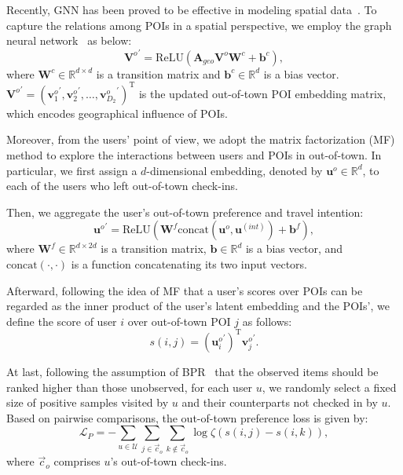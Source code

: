 \documentclass[letterpaper]{article} %
\begin{document}
Recently, GNN has been proved to be effective in modeling spatial data~\cite{zhang2020semi,li2020competitive,geng2019spatiotemporal}.
To capture the relations among POIs in a spatial perspective, we employ the graph neural network~\cite{kipf2016semi} as below:
\begin{equation}\label{e:geo_conv}
    {\mathbf{V}^o}^{\prime} = 
    \mathrm{ReLU}\left(
    \mathbf{A}_{geo} \mathbf{V}^o \mathbf{W}^c + \bm{b}^c
    \right)  ,
\end{equation}
%
where $\mathbf{W}^c \in \mathbb{R}^{d \times d}$ is a transition matrix and $\bm{b}^c \in \mathbb{R}^d$ is a bias vector.
${\mathbf{V}^o}^{\prime} = 
{\left(
{\mathbf{v}^o_1}^{\prime},{\mathbf{v}^o_2}^{\prime}, \ldots,
{\mathbf{v}^o_{D_2}}^{\prime}
\right)}^\mathrm{T}$
is the updated out-of-town POI embedding matrix,
which encodes geographical influence of POIs.

Moreover, from the users' point of view,
we adopt the matrix factorization (MF) method to explore the interactions between users and POIs in out-of-town.
In particular, we first assign a $d$-dimensional embedding, denoted by $\mathbf{u}^o \in \mathbb{R}^d$, to each of the users who left out-of-town check-ins.

Then, we aggregate the user's out-of-town preference and travel intention:
\begin{equation}\label{e:fuse}
    {\mathbf{u}^o}^{\prime} = 
    \mathrm{ReLU}\left(
    \mathbf{W}^f \mathrm{concat} \left(
        \mathbf{u}^o, \mathbf{u}^{(int)}
    \right)
    + \bm{b}^f
    \right) ,
\end{equation}
where $\mathbf{W}^f \in \mathbb{R}^{d \times 2d}$ is a transition matrix, $\bm{b} \in \mathbb{R} ^ d$ is a bias vector, and
$\mathrm{concat}(\cdot, \cdot)$ is a function concatenating its two input vectors.

Afterward, following the idea of MF that a user's scores over POIs can be regarded as the inner product of the user's latent embedding and the POIs', we define the score of user $i$ over out-of-town POI $j$ as follows:
\begin{equation}\label{e:score}
    s(i,j) = 
    \left({\mathbf{u}^o_i}^{\prime}\right)^\mathrm{T}
    {\mathbf{v}^o_j}^{\prime} .
\end{equation}

At last, following the assumption of BPR~\cite{rendle2012bpr} that the observed items should be ranked higher than those unobserved, for each user $u$, we randomly select a fixed size of positive samples visited by $u$ and their counterparts not checked in by $u$. 
Based on pairwise comparisons, the out-of-town preference loss is given by:
\begin{equation}\label{e:bpr_loss}
    \mathcal{L}_P = - 
    \sum_{u \in \mathcal{U}}
    \sum_{j \in \vec{c}_o}
    \sum_{k \notin \vec{c}_o} 
    \log\zeta\left( s(i,j) - s(i,k) \right) ,
\end{equation}
where $\vec{c}_o$ comprises $u$'s out-of-town check-ins.
\end{document}
